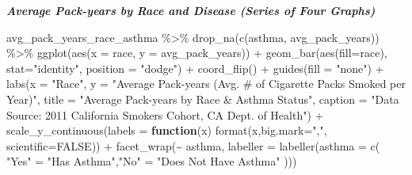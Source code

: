 \documentclass[
]{article}
\newenvironment{Shaded}{\begin{snugshade}}{\end{snugshade}}
\newcommand{\AttributeTok}[1]{\textcolor[rgb]{0.77,0.63,0.00}{#1}}
\newcommand{\ConstantTok}[1]{\textcolor[rgb]{0.00,0.00,0.00}{#1}}
\newcommand{\ControlFlowTok}[1]{\textcolor[rgb]{0.13,0.29,0.53}{\textbf{#1}}}
\newcommand{\FunctionTok}[1]{\textcolor[rgb]{0.00,0.00,0.00}{#1}}
\newcommand{\NormalTok}[1]{#1}
\newcommand{\OtherTok}[1]{\textcolor[rgb]{0.56,0.35,0.01}{#1}}
\newcommand{\SpecialCharTok}[1]{\textcolor[rgb]{0.00,0.00,0.00}{#1}}
\newcommand{\StringTok}[1]{\textcolor[rgb]{0.31,0.60,0.02}{#1}}
\begin{document}
\newpage

\emph{\textbf{Average Pack-years by Race and Disease (Series of Four
Graphs)}}

\begin{Shaded}
\begin{Highlighting}[]
\NormalTok{avg\_pack\_years\_race\_asthma }\SpecialCharTok{\%\textgreater{}\%}
  \FunctionTok{drop\_na}\NormalTok{(}\FunctionTok{c}\NormalTok{(asthma, avg\_pack\_years)) }\SpecialCharTok{\%\textgreater{}\%}
  \FunctionTok{ggplot}\NormalTok{(}\FunctionTok{aes}\NormalTok{(}\AttributeTok{x =}\NormalTok{ race, }\AttributeTok{y =}\NormalTok{ avg\_pack\_years)) }\SpecialCharTok{+}
  \FunctionTok{geom\_bar}\NormalTok{(}\FunctionTok{aes}\NormalTok{(}\AttributeTok{fill=}\NormalTok{race), }\AttributeTok{stat=}\StringTok{"identity"}\NormalTok{, }\AttributeTok{position =} \StringTok{"dodge"}\NormalTok{) }\SpecialCharTok{+}
  \FunctionTok{coord\_flip}\NormalTok{() }\SpecialCharTok{+}
  \FunctionTok{guides}\NormalTok{(}\AttributeTok{fill =} \StringTok{"none"}\NormalTok{) }\SpecialCharTok{+}
  \FunctionTok{labs}\NormalTok{(}\AttributeTok{x =} \StringTok{"Race"}\NormalTok{,}
       \AttributeTok{y =} \StringTok{"Average Pack{-}years (Avg. \# of Cigarette Packs Smoked per Year)"}\NormalTok{,}
  \AttributeTok{title =} \StringTok{"Average Pack{-}years by Race \& Asthma Status"}\NormalTok{,}
  \AttributeTok{caption =} \StringTok{"Data Source: 2011 California Smokers Cohort, CA Dept. of Health"}\NormalTok{) }\SpecialCharTok{+}
  \FunctionTok{scale\_y\_continuous}\NormalTok{(}\AttributeTok{labels =} \ControlFlowTok{function}\NormalTok{(x) }\FunctionTok{format}\NormalTok{(x,}\AttributeTok{big.mark=}\StringTok{","}\NormalTok{,}
                                                     \AttributeTok{scientific=}\ConstantTok{FALSE}\NormalTok{)) }\SpecialCharTok{+}
  \FunctionTok{facet\_wrap}\NormalTok{(}\SpecialCharTok{\textasciitilde{}}\NormalTok{ asthma, }\AttributeTok{labeller =} \FunctionTok{labeller}\NormalTok{(}\AttributeTok{asthma =}
                                             \FunctionTok{c}\NormalTok{( }\StringTok{"Yes"} \OtherTok{=} \StringTok{"Has Asthma"}\NormalTok{,}\StringTok{"No"} \OtherTok{=} \StringTok{"Does Not Have Asthma"}
\NormalTok{                                                     )))}
\end{Highlighting}
\end{Shaded}
\end{document}
